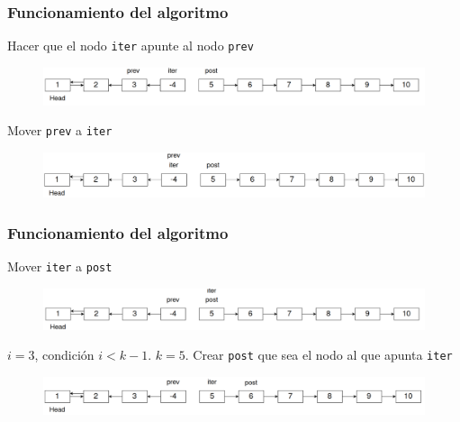 \documentclass[17pt, t, lualatex]{beamer}
\newcommand{\cppinline}[1]{\lstinline[style=cppstyle]!#1!}
\begin{document}
\begin{frame}
  \frametitle{Funcionamiento del algoritmo}

  Hacer que el nodo \cppinline{iter} apunte al nodo \cppinline{prev}

  \begin{figure}[h]
    \centering
    \includegraphics[width=\textwidth]{img/fig14.png}
  \end{figure}

  Mover \cppinline{prev} a \cppinline{iter}

  \begin{figure}[h]
    \centering
    \includegraphics[width=\textwidth]{img/fig15.png}
  \end{figure}

\end{frame}

\begin{frame}
  \frametitle{Funcionamiento del algoritmo}

  Mover \cppinline{iter} a \cppinline{post}

  \begin{figure}[h]
    \centering
    \includegraphics[width=\textwidth]{img/fig16.png}
  \end{figure}

  $i = 3$, condición $i < k-1$. $k = 5$. Crear \cppinline{post} que sea el nodo al que apunta \cppinline{iter}

  \begin{figure}[h]
    \centering
    \includegraphics[width=\textwidth]{img/fig17.png}
  \end{figure}

\end{frame}
\end{document}
